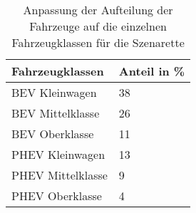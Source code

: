 {
\renewcommand{\arraystretch}{1.2}%
\begin{table}[H]
	\begin{center}
		\caption{Anpassung der Aufteilung der Fahrzeuge auf die einzelnen Fahrzeugklassen für die Szenarette}
		\begin{tabu} to 0.7\textwidth {X[1] X[1, r]}
			\hline
			Fahrzeugklassen   & Anteil in \si{\percent} \\ \hline
			BEV Kleinwagen    & \num{38}                \\
			BEV Mittelklasse  & \num{26}                \\
			BEV Oberklasse    & \num{11}                \\
			PHEV Kleinwagen   & \num{13}                \\
			PHEV Mittelklasse & \num{9}                 \\
			PHEV Oberklasse   & \num{4}                 \\ \hline
		\end{tabu}
		\label{tab:CarSplitSzenarette}
	\end{center}
	\vspace{-3mm}%
\end{table}
}